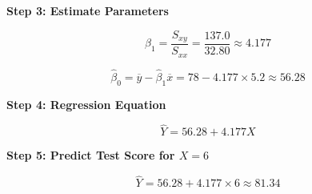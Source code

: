 \documentclass[twoside]{book}
\begin{document}
\textbf{Step 3: Estimate Parameters}

\[
\hat{\beta}_1 = \frac{S_{xy}}{S_{xx}} = \frac{137.0}{32.80}\approx4.177
\]

\[
\hat{\beta}_0 = \overline{y} - \hat{\beta}_1 \overline{x} = 78-4.177\times 5.2\approx56.28
\]

\textbf{Step 4: Regression Equation}

\[
\hat{Y} = 56.28 + 4.177X
\]

\textbf{Step 5: Predict Test Score for $X = 6$}

\[
\hat{Y} = 56.28 + 4.177\times6 \approx 81.34
\]





\end{document}
